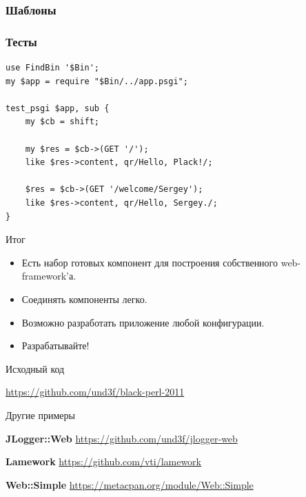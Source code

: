 \documentclass[17pt]{beamer}
\newcommand{\otherlink}[2]{
    {\bf #1} \smallskip
    {\small \url{#2}} \bigskip
}
\begin{document}
\begin{frame}[fragile]
\frametitle{Шаблоны}
\lstset{language=html}


\end{frame}

\begin{frame}[fragile]
\frametitle{Тесты}
\lstset{language=perl}
\begin{lstlisting}
use FindBin '$Bin';
my $app = require "$Bin/../app.psgi";

test_psgi $app, sub {
    my $cb = shift;

    my $res = $cb->(GET '/');
    like $res->content, qr/Hello, Plack!/;

    $res = $cb->(GET '/welcome/Sergey');
    like $res->content, qr/Hello, Sergey./;
}
\end{lstlisting}
\end{frame}

\begin{frame}{Итог}

\begin{itemize}

\item Есть набор готовых компонент для построения собственного web-framework'а.

\item Соединять компоненты легко.
\item Возможно разработать приложение любой конфигурации.

\item Разрабатывайте!

\end{itemize}
\end{frame}

\begin{frame}{Исходный код}

{\small \url{https://github.com/und3f/black-perl-2011}}

\end{frame}

\begin{frame}{Другие примеры}

\otherlink{JLogger::Web}{https://github.com/und3f/jlogger-web}

\otherlink{Lamework}{https://github.com/vti/lamework}

\otherlink{Web::Simple}{https://metacpan.org/module/Web::Simple}

\end{frame}

\begin{frame}{ }


\end{frame}
\end{document}
